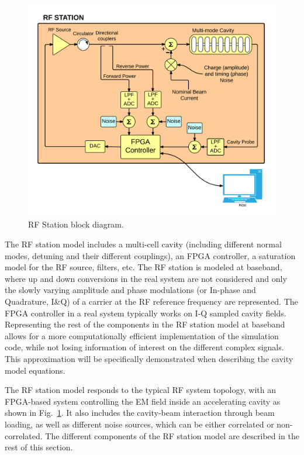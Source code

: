 \documentclass[a4paper,12pt]{article}
\begin{document}
\begin{figure}
\centering
\includegraphics[scale=0.75]{../figures/Station_rf_blocks.png}
\caption{RF Station block diagram.}
\label{fig:Station_block_diagram}
\end{figure}

The RF station model includes a multi-cell cavity (including different normal modes, detuning and their different couplings), an FPGA controller, a saturation model for the RF source, filters, etc. The RF station is modeled at baseband, where up and down conversions in the real system are not considered and only the slowly varying amplitude and phase modulations (or In-phase and Quadrature, I\&Q) of a carrier at the RF reference frequency are represented. The FPGA controller in a real system typically works on I-Q sampled cavity fields. Representing the rest of the components in the RF station model at baseband allows for a more computationally efficient implementation of the simulation code, while not losing information of interest on the different complex signals. This approximation will be specifically demonstrated when describing the cavity model equations.

The RF station model responds to the typical RF system topology, with an FPGA-based system controlling the EM field inside an accelerating cavity as shown in Fig.~\ref{fig:Station_block_diagram}. It also includes the cavity-beam interaction through beam loading, as well as different noise sources, which can be either correlated or non-correlated. The different components of the RF station model are described in the rest of this section.
\end{document}
